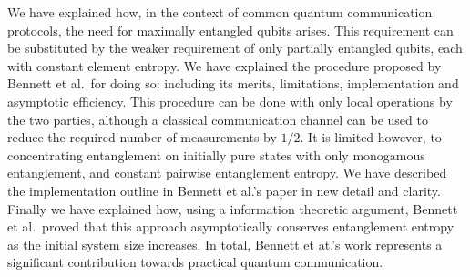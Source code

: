 We have explained how, in the context of common quantum communication protocols, the need for maximally entangled qubits arises.
This requirement can be substituted by the weaker requirement of only partially entangled qubits, each with constant element entropy.
We have explained the procedure proposed by Bennett et al.\ for doing so: including its merits, limitations, implementation and asymptotic efficiency. 
This procedure can be done with only local operations by the two parties, although a classical communication channel can be used to reduce the required number of measurements by $1/2$.
It is limited however, to concentrating entanglement on initially pure states with only monogamous entanglement, and constant pairwise entanglement entropy.
We have described the implementation outline in Bennett et al.'s paper in new detail and clarity.
Finally we have explained how, using a information theoretic argument, Bennett et al.\ proved that this approach asymptotically conserves entanglement entropy as the initial system size increases.
In total, Bennett et at.'s work represents a significant contribution towards practical quantum communication.